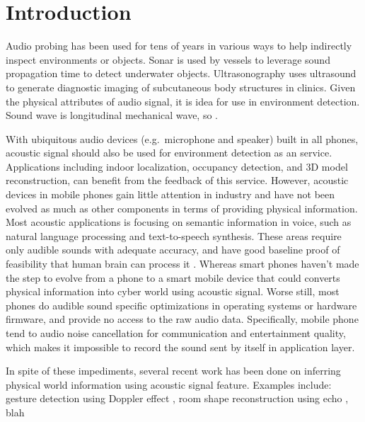 \section{Introduction}
\label{sec:intro}




Audio probing has been used for tens of years in various ways to help indirectly
inspect environments or objects. Sonar is used by vessels to leverage sound propagation 
time to detect underwater objects. Ultrasonography uses ultrasound to generate
diagnostic imaging of subcutaneous body structures in clinics. 
Given the physical attributes of audio signal, it is idea for use in environment detection.
Sound wave is longitudinal mechanical wave, so . 


With ubiquitous audio devices (e.g.\ microphone and speaker) built in all phones, 
acoustic signal should also be used for 
environment detection as an service. Applications including indoor localization, occupancy detection,
and 3D model reconstruction, can benefit from the feedback of this service.
However, acoustic devices in mobile phones gain little attention in 
industry and have not been evolved as much as other components \cite{invensense, applem7} 
in terms of providing physical information.
Most acoustic applications is focusing on semantic information in voice, such as natural 
language processing and text-to-speech synthesis. These areas require only audible
sounds with adequate 
accuracy, and have good baseline proof of feasibility that human brain can process it
\cite{nirjon2013auditeur}.
Whereas smart phones haven't made the step to evolve from a phone to a smart 
mobile device that could converts physical information into cyber world using acoustic signal. 
Worse still, most phones do audible sound specific optimizations in operating systems or 
hardware firmware, and provide no access to the raw audio data. Specifically, mobile phone
tend to audio noise cancellation for communication and entertainment quality, which makes 
it impossible to record the sound sent by itself in application layer.


In spite of these impediments, several recent work has been done on inferring physical world 
information using acoustic signal feature. Examples include: gesture detection using Doppler effect
\cite{gupta2012soundwave, sun2013spartacus}, room shape reconstruction using echo \cite{dokmanic2013acoustic}, 
blah


